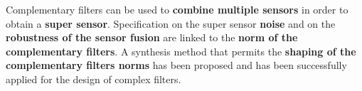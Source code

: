 
Complementary filters can be used to \textbf{combine multiple sensors} in order
to obtain a \textbf{super sensor}.
Specification on the super sensor \textbf{noise} and on the \textbf{robustness
  of the sensor fusion} are linked to the \textbf{norm of the complementary filters}.
A synthesis method that permits the \textbf{shaping of the complementary filters
  norms} has been proposed and has been successfully applied for the design of
complex filters.
\vspace{0.5em}
